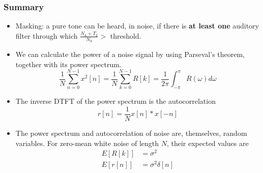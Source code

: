 \documentclass{beamer}
\begin{document}
\begin{frame}
  \frametitle{Summary}
  \begin{itemize}
  \item Masking: a pure tone can be heard, in noise, if there is {\bf at least one}
    auditory filter through which $\frac{N_k+T_k}{N_k}>$ threshold.
  \item We can calculate the power of a noise signal by using Parseval's theorem, together with
    its power spectrum.
    \[
    \frac{1}{N}\sum_{n=0}^{N-1}x^2[n] = \frac{1}{N}\sum_{k=0}^{N-1}R[k]=
    \frac{1}{2\pi}\int_{-\pi}^{\pi}R(\omega)d\omega
    \]
  \item The inverse DTFT of the power spectrum is the autocorrelation
    \[
    r[n] = \frac{1}{N} x[n]\ast x[-n]
    \]
  \item The power spectrum and autocorrelation of noise are, themselves, random variables.
    For zero-mean white noise of length $N$, their expected values are
    \begin{align*}
      E\left[R[k]\right] &= \sigma^2\\
      E\left[r[n]\right] &= \sigma^2\delta[n]
    \end{align*}
  \end{itemize}
\end{frame}
\end{document}
